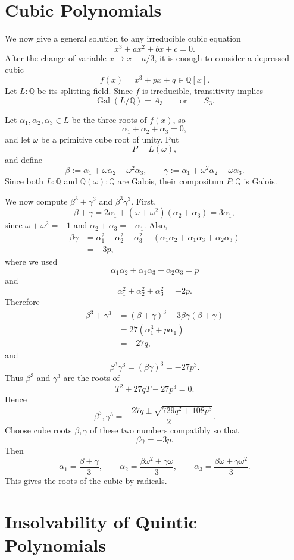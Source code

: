 \section{Cubic Polynomials}

We now give a general solution to any irreducible cubic equation
\[
x^3+ax^2+bx+c=0.
\]
After the change of variable $x\mapsto x-a/3$, it is enough to consider a depressed cubic
\[
f(x)=x^3+px+q\in\mathbb Q[x].
\]
Let $L:\mathbb Q$ be its splitting field. Since $f$ is irreducible, transitivity implies
\[
\operatorname{Gal}(L/\mathbb Q)=A_3
\qquad\text{or}\qquad
S_3.
\]

Let $\alpha_1,\alpha_2,\alpha_3\in L$ be the three roots of $f(x)$, so
\[
\alpha_1+\alpha_2+\alpha_3=0,
\]
and let $\omega$ be a primitive cube root of unity. Put
\[
P=L(\omega),
\]
and define
\[
\beta:=\alpha_1+\omega\alpha_2+\omega^2\alpha_3,
\qquad
\gamma:=\alpha_1+\omega^2\alpha_2+\omega\alpha_3.
\]
Since both $L:\mathbb Q$ and $\mathbb Q(\omega):\mathbb Q$ are Galois, their compositum $P:\mathbb Q$ is Galois.

We now compute $\beta^3+\gamma^3$ and $\beta^3\gamma^3$. First,
\[
\beta+\gamma
=2\alpha_1+(\omega+\omega^2)(\alpha_2+\alpha_3)
=3\alpha_1,
\]
since $\omega+\omega^2=-1$ and $\alpha_2+\alpha_3=-\alpha_1$. Also,
\begin{align*}
\beta\gamma
&=\alpha_1^2+\alpha_2^2+\alpha_3^2
-(\alpha_1\alpha_2+\alpha_1\alpha_3+\alpha_2\alpha_3)\\
&=-3p,
\end{align*}
where we used
\[
\alpha_1\alpha_2+\alpha_1\alpha_3+\alpha_2\alpha_3=p
\]
and
\[
\alpha_1^2+\alpha_2^2+\alpha_3^2=-2p.
\]
Therefore
\begin{align*}
\beta^3+\gamma^3
&=(\beta+\gamma)^3-3\beta\gamma(\beta+\gamma)\\
&=27(\alpha_1^3+p\alpha_1)\\
&=-27q,
\end{align*}
and
\[
\beta^3\gamma^3=(\beta\gamma)^3=-27p^3.
\]
Thus $\beta^3$ and $\gamma^3$ are the roots of
\[
T^2+27qT-27p^3=0.
\]
Hence
\[
\boxed{
\beta^3,\gamma^3
=\frac{-27q\pm\sqrt{729q^2+108p^3}}{2}.}
\]
Choose cube roots $\beta,\gamma$ of these two numbers compatibly so that
\[
\beta\gamma=-3p.
\]
Then
\[
\alpha_1=\frac{\beta+\gamma}{3},
\qquad
\alpha_2=\frac{\beta\omega^2+\gamma\omega}{3},
\qquad
\alpha_3=\frac{\beta\omega+\gamma\omega^2}{3}.
\]
This gives the roots of the cubic by radicals.

\section{Insolvability of Quintic Polynomials}

